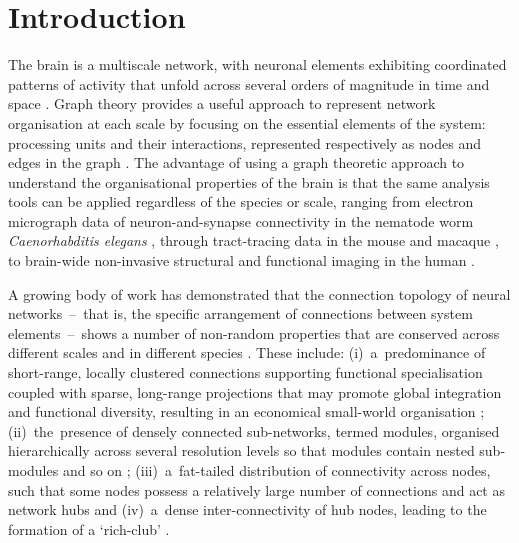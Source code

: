 \section{Introduction}

The brain is a multiscale network, with neuronal elements exhibiting coordinated patterns of activity that unfold across several orders of magnitude in time and space \citep{Buzsaki2004,Lichtman2011,Fornito2016}.
Graph theory provides a useful approach to represent network organisation at each scale by focusing on the essential elements of the system: processing units and their interactions, represented respectively as nodes and edges in the graph \citep{Bullmore2009,Fornito2016}.
The advantage of using a graph theoretic approach to understand the organisational properties of the brain is that the same analysis tools can be applied regardless of the species or scale, ranging from electron micrograph data of neuron-and-synapse connectivity in the nematode worm \textit{Caenorhabditis elegans} \citep{White1986,Varshney2011}, through tract-tracing data in the mouse \citep{Oh2014,Gamanut2018} and macaque \citep{Stephan2001,Markov2014}, to brain-wide non-invasive structural and functional imaging in the human \citep{Bassett2009a,Bullmore2009,Fornito2013}.

A growing body of work has demonstrated that the connection topology of neural \mbox{networks -- that} is, the specific arrangement of connections between system \mbox{elements -- shows} a number of non-random properties that are conserved across different scales and in different species \citep{Bullmore2009,Sporns2011,Fornito2016,VandenHeuvel2016,Schroter2017}. These include: \mbox{(i) a predominance} of short-range, locally clustered connections supporting functional specialisation coupled with sparse, long-range projections that may promote global integration and functional diversity, resulting in an economical small-world organisation \citep{Watts1998,Bassett2017,Betzel2017}; \mbox{(ii) the presence} of densely connected sub-networks, termed modules, organised hierarchically across several resolution levels so that modules contain nested sub-modules and so on \citep{Meunier2009,Bassett2010}; \mbox{(iii) a fat-tailed} distribution of connectivity across nodes, such that some nodes possess a relatively large number of connections and act as network hubs  \citep{VandenHeuvel2011,Towlson2013,VandenHeuvel2016} and \mbox{(iv) a dense} inter-connectivity of hub nodes, leading to the formation of a `rich-club' \citep{Zamora-Lopez2010,VandenHeuvel2011,Harriger2012,Towlson2013}.

